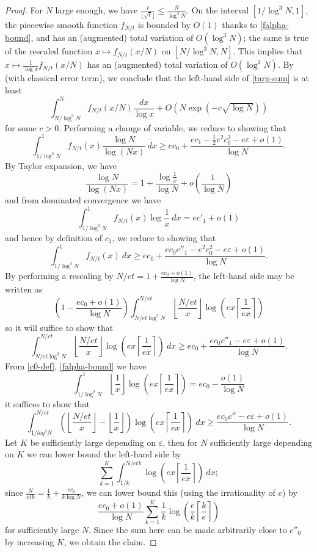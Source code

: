 \documentclass[12pt,a4paper,reqno]{amsart}
\numberwithin{equation}{section}
\theoremstyle{plain}
\theoremstyle{definition}
\newcommand\eps{\varepsilon}
\begin{document}
\begin{proof}
    For $N$ large enough, we have $\frac{t}{\lfloor\sqrt{t}\rfloor} \leq \frac{N}{\log^3 N}$.
    On the interval $[1/\log^3 N,1]$, the piecewise smooth function $f_{N/t}$ is bounded by $O(1)$ thanks to \eqref{falpha-bound}, and has an (augmented) total variation of $O(\log^3\! N)$; the same is true of the rescaled function $x \mapsto f_{N/t}(x/N)$ on $[N/\log^3\! N,N]$.   This implies that $x \mapsto \frac{1}{\log x} f_{N/t}(x/N)$ has an (augmented) total variation of $O(\log^2 N)$.
   By  (with classical error term), we conclude that the left-hand side of \eqref{targ-sum} is at least
    $$ \int_{N/\log^3 N}^N f_{N/t}(x/N) \frac{dx}{\log x} + O\left( N \exp(-c\sqrt{\log N}) \right)$$
    for some $c>0$.  Performing a change of variable, we reduce to showing that
    $$  \int_{1/\log^3 N}^1 f_{N/t}(x) \frac{\log N}{\log(Nx)}\ dx 
    \geq  ec_0 + \frac{ec_1 - \frac{1}{2} e^2 c_0^2 - e \eps + o(1)}{\log N}.$$
    By Taylor expansion, we have
    $$ \frac{\log N}{\log(Nx)} = 1 + \frac{\log \frac{1}{x}}{\log N}  + o\left(\frac{1}{\log N}\right)$$
    and from dominated convergence we have
  $$
  \int_{1/\log^3 N}^1 f_{N/t}(x) \log \frac{1}{x}\ dx = ec'_1 + o(1)$$
and hence by definition of $c_1$, we reduce to showing that
$$  \int_{1/\log^3 N}^1 f_{N/t}(x)\ dx 
\geq  ec_0 + \frac{ec_0 c''_1 - e^2 c_0^2 - e\eps + o(1)}{\log N}.$$
By performing a rescaling by $N/et = 1 + \frac{ec_0+o(1)}{\log N}$, the left-hand side may be written as
$$ \left(1 - \frac{ec_0+o(1)}{\log N}\right) \int_{N/et\log^3 N}^{N/et}
\left\lfloor \frac{N/et}{x} \right\rfloor \log\left(ex \left\lceil \frac{1}{ex} \right\rceil \right) $$
so it will suffice to show that
$$
\int_{N/et\log^3 N}^{N/et}
\left\lfloor \frac{N/et}{x} \right\rfloor \log\left(ex \left\lceil \frac{1}{ex} \right\rceil \right)\ dx \geq ec_0 + \frac{ec_0 c''_1 - e\eps + o(1)}{\log N}.$$
From \eqref{c0-def}, \eqref{falpha-bound} we have
$$ \int_{1/\log^2 N}^1 \left\lfloor \frac{1}{x} \right\rfloor \log\left(ex \left\lceil \frac{1}{ex} \right\rceil \right) = ec_0 - \frac{o(1)}{\log N}$$
it suffices to show that
$$
\int_{1/log^2 N}^{N/et}
\left(\left\lfloor \frac{N/et}{x} \right\rfloor - \left\lfloor \frac{1}{x} \right\rfloor\right) \log\left(ex \left\lceil \frac{1}{ex} \right\rceil \right)\ dx \geq \frac{ec_0 c'' - e\eps + o(1)}{\log N}.$$
Let $K$ be sufficiently large depending on $\eps$, then for $N$ sufficiently large depending on $K$ we can lower bound the left-hand side by
$$ \sum_{k=1}^K \int_{1/k}^{N/etk} \log\left(ex \left\lceil \frac{1}{ex} \right\rceil \right)\ dx;$$
since $\frac{N}{etk} = \frac{1}{k} + \frac{ec_0}{k \log N}$, we can lower bound this (using the irrationality of $e$) by
$$ \frac{ec_0+o(1)}{\log N} \sum_{k=1}^K \frac{1}{k} \log\left(\frac{e}{k} \left\lceil \frac{k}{e} \right\rceil\right)$$
for sufficiently large $N$.  Since the sum here can be made arbitrarily close to $c''_0$ by increasing $K$, we obtain the claim.
\end{proof}
    
\end{document}
